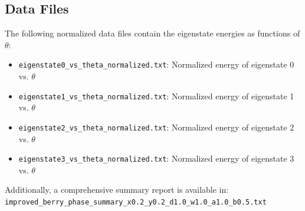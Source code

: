 \documentclass[12pt,a4paper]{article}
\begin{document}
\subsection{Data Files}

The following normalized data files contain the eigenstate energies as functions of $\theta$:

\begin{itemize}
    \item \texttt{eigenstate0\_vs\_theta\_normalized.txt}: Normalized energy of eigenstate 0 vs. $\theta$
    \item \texttt{eigenstate1\_vs\_theta\_normalized.txt}: Normalized energy of eigenstate 1 vs. $\theta$
    \item \texttt{eigenstate2\_vs\_theta\_normalized.txt}: Normalized energy of eigenstate 2 vs. $\theta$
    \item \texttt{eigenstate3\_vs\_theta\_normalized.txt}: Normalized energy of eigenstate 3 vs. $\theta$
\end{itemize}

Additionally, a comprehensive summary report is available in:\\\texttt{improved\_berry\_phase\_summary\_x0.2\_y0.2\_d1.0\_w1.0\_a1.0\_b0.5.txt}
\end{document}
